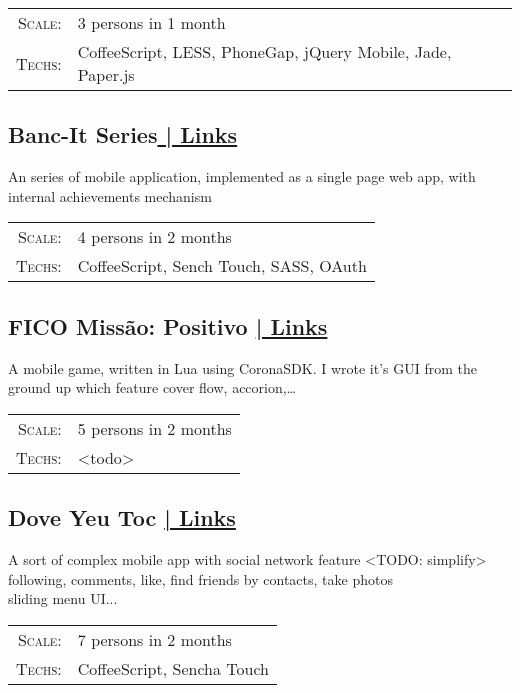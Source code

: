 \documentclass[a4paper,10pt]{article}
\begin{document}
\begin{tabular}{rl}
    \textsc{Scale:} & 3 persons in 1 month\\
    \textsc{Techs:} & CoffeeScript, LESS, PhoneGap, jQuery Mobile, Jade, Paper.js\\
\end{tabular}

\subsection*{Banc-It Series\hfill \hyperlink{bancit-links}{ | \footnotesize Links}}

An series of mobile application, implemented as a single page web app, with internal achievements mechanism

\begin{tabular}{rl}
    \textsc{Scale:} & 4 persons in 2 months\\
    \textsc{Techs:} & CoffeeScript, Sench Touch, SASS, OAuth\\
    
\end{tabular}

\subsection*{FICO Missão: Positivo \hfill \hyperlink{fico-links} { | \footnotesize Links}}

A mobile game, written in Lua using CoronaSDK. I wrote it's GUI from the ground up which feature cover flow, accorion,\ldots

\begin{tabular}{rl}
    \textsc{Scale:} & 5 persons in 2 months\\
    \textsc{Techs:} & <todo>\\
\end{tabular}

\subsection*{Dove Yeu Toc \hfill \hyperlink{dove-links} { | \footnotesize Links}}

A sort of complex mobile app with social network feature <TODO: simplify> following, comments, like, find friends by contacts, take photos\\
sliding menu UI...

\begin{tabular}{rl}
    \textsc{Scale:} & 7 persons in 2 months\\
    \textsc{Techs:} & CoffeeScript, Sencha Touch\\
\end{tabular}
\end{document}

